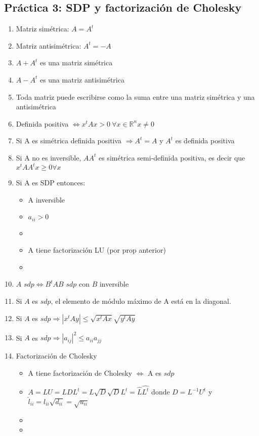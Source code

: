 \subsection*{Práctica 3: SDP y factorización de Cholesky}
\begin{enumerate}
    \item Matriz simétrica: $A=A^t$
    \item Matriz antisimétrica: $A^t=-A$
    \item $A+A^t$ es una matriz simétrica
    \item $A-A^t$ es una matriz antisimétrica
    \item Toda matriz puede escribirse como la suma entre una matriz simétrica y una antisimétrica
    \item Definida positiva $\iff x^tAx>0 \  \forall x \in \mathbb{R}^n x\neq0$
    \item Si A es simétrica definida positiva $\Rightarrow A^t = A$ y $A^t$ es definida positiva
    \item Si A no es inversible, $AA^t$ es simétrica semi-definida positiva, es decir que $x^tAA^tx \geq 0 \forall x $
    \item Si A es SDP entonces:
    \begin{itemize}
        \item A inversible
        \item $a_{ii} > 0$
        \item {}
        \item A tiene factorización LU (por prop anterior)
        \item {}
    \end{itemize}
    \item $A$ $sdp \iff B^tAB$ $sdp$ con $B$ inversible
    \item Si $A$ es $sdp$, el elemento de módulo máximo de A está en la diagonal. 
    \item Si $A$ es $sdp \Rightarrow |x^tAy| \leq \sqrt{x^tAx}\sqrt{y^tAy}$ 
    \item Si $A$ es $sdp \Rightarrow |a_{ij}|^2\leq a_{ii}a_{jj}$
    \item Factorización de Cholesky
    \begin{itemize}
        \item A tiene factorización de Cholesky $\iff$ A es $sdp$
        \item $A = LU = LDL^t = L\sqrt{D}\sqrt{D}L^t = \hat{L}\hat{L^t}$ donde $D = L^{-1}U^t$ y $\hat{l}_{ii} = l_{ii}\sqrt{d_{ii}} = \sqrt{u_{ii}}$
        \item {}
        \item {}
    \end{itemize}
\end{enumerate}

